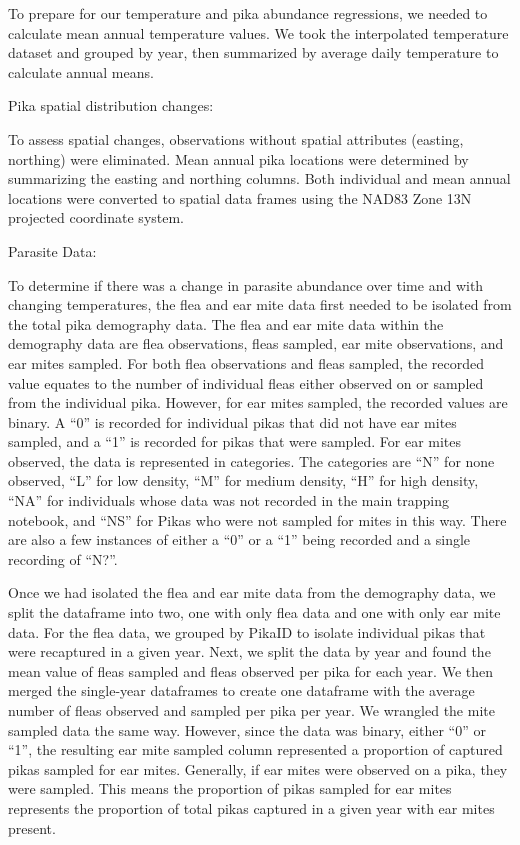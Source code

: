 \documentclass[
  12pt,
]{article}
\begin{document}
To prepare for our temperature and pika abundance regressions, we needed
to calculate mean annual temperature values. We took the interpolated
temperature dataset and grouped by year, then summarized by average
daily temperature to calculate annual means.

Pika spatial distribution changes:

To assess spatial changes, observations without spatial attributes
(easting, northing) were eliminated. Mean annual pika locations were
determined by summarizing the easting and northing columns. Both
individual and mean annual locations were converted to spatial data
frames using the NAD83 Zone 13N projected coordinate system.

Parasite Data:

To determine if there was a change in parasite abundance over time and
with changing temperatures, the flea and ear mite data first needed to
be isolated from the total pika demography data. The flea and ear mite
data within the demography data are flea observations, fleas sampled,
ear mite observations, and ear mites sampled. For both flea observations
and fleas sampled, the recorded value equates to the number of
individual fleas either observed on or sampled from the individual pika.
However, for ear mites sampled, the recorded values are binary. A ``0''
is recorded for individual pikas that did not have ear mites sampled,
and a ``1'' is recorded for pikas that were sampled. For ear mites
observed, the data is represented in categories. The categories are
``N'' for none observed, ``L'' for low density, ``M'' for medium
density, ``H'' for high density, ``NA'' for individuals whose data was
not recorded in the main trapping notebook, and ``NS'' for Pikas who
were not sampled for mites in this way. There are also a few instances
of either a ``0'' or a ``1'' being recorded and a single recording of
``N?''.

Once we had isolated the flea and ear mite data from the demography
data, we split the dataframe into two, one with only flea data and one
with only ear mite data. For the flea data, we grouped by PikaID to
isolate individual pikas that were recaptured in a given year. Next, we
split the data by year and found the mean value of fleas sampled and
fleas observed per pika for each year. We then merged the single-year
dataframes to create one dataframe with the average number of fleas
observed and sampled per pika per year. We wrangled the mite sampled
data the same way. However, since the data was binary, either ``0'' or
``1'', the resulting ear mite sampled column represented a proportion of
captured pikas sampled for ear mites. Generally, if ear mites were
observed on a pika, they were sampled. This means the proportion of
pikas sampled for ear mites represents the proportion of total pikas
captured in a given year with ear mites present.
\end{document}

